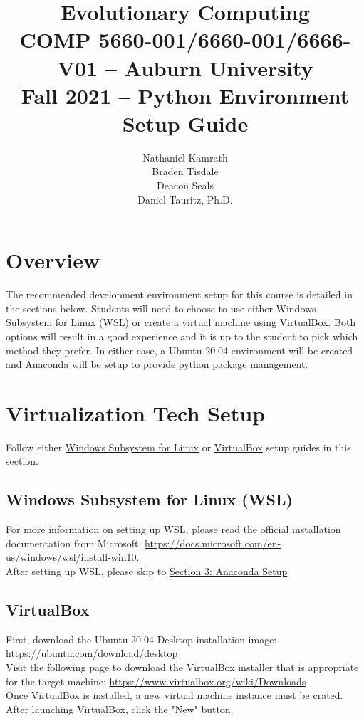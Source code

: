 \documentclass{article}
\title{Evolutionary Computing\\
        COMP 5660-001/6660-001/6666-V01 -- Auburn University\\
        Fall 2021 -- Python Environment Setup Guide}
\author{Nathaniel Kamrath\\
Braden Tisdale \\
Deacon Seals \\
Daniel Tauritz, Ph.D.}
\begin{document}
\maketitle

\section{Overview}
The recommended development environment setup for this course is detailed in the sections below.  Students will need to choose to use either Windows Subsystem for Linux (WSL) or create a virtual machine using VirtualBox.  Both options will result in a good experience and it is up to the student to pick which method they prefer.  In either case, a Ubuntu 20.04 environment will be created and Anaconda will be setup to provide python package management.

\section{Virtualization Tech Setup}
Follow either \hyperref[sec:wsl]{Windows Subsystem for Linux} or \hyperref[sec:vb]{VirtualBox} setup guides in this section.
\subsection{Windows Subsystem for Linux (WSL)} \label{sec:wsl}
For more information on setting up WSL, please read the official installation documentation from Microsoft:
\url{https://docs.microsoft.com/en-us/windows/wsl/install-win10}.\\

After setting up WSL, please skip to \hyperref[sec:anacondasetup]{Section 3: Anaconda Setup}

\subsection{VirtualBox} \label{sec:vb}
First, download the Ubuntu 20.04 Desktop installation image: \url{https://ubuntu.com/download/desktop}\\

Visit the following page to download the VirtualBox installer that is appropriate for the target machine: \url{https://www.virtualbox.org/wiki/Downloads}\\

Once VirtualBox is installed, a new virtual machine instance must be crated.  After launching VirtualBox, click the "New" button.
\end{document}
